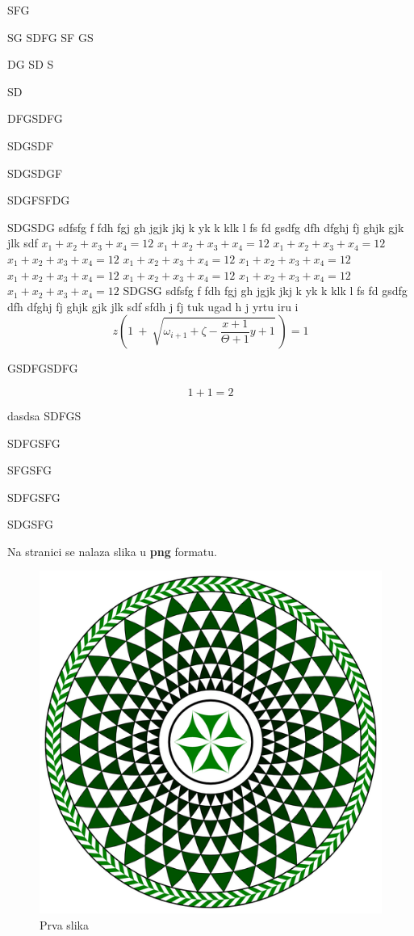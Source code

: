 \documentclass[a4paper,twoside,12pt]{memoir} %
\begin{document}
SFG

SG
SDFG
SF
GS

DG
 SD
S


SD
 

DFGSDFG


SDGSDF


SDGSDGF


SDGFSFDG


SDGSDG  sdfsfg f fdh fgj gh jgjk jkj k yk k klk l fs fd gsdfg dfh dfghj fj ghjk gjk jlk sdf 
$x_1+x_2+x_3+x_4=12$ $x_1+x_2+x_3+x_4=12$
 $x_1+x_2+x_3+x_4=12$ $x_1+x_2+x_3+x_4=12$ $x_1+x_2+x_3+x_4=12$ $x_1+x_2+x_3+x_4=12$
 $x_1+x_2+x_3+x_4=12$ $x_1+x_2+x_3+x_4=12$ $x_1+x_2+x_3+x_4=12$
$x_1+x_2+x_3+x_4=12$ 
SDGSG sdfsfg f fdh fgj gh jgjk jkj k yk k klk l fs fd gsdfg dfh dfghj fj ghjk gjk jlk sdf sfdh j fj tuk ugad h j yrtu iru i
\[ z \left( 1 \ +\ \sqrt{\omega_{i+1} + \zeta -\frac{x+1}{\Theta +1} y + 1}
\ \right) =  1 \]

GSDFGSDFG



\begin{equation}
\label{eq:jed1}
	1+1=2
\end{equation}

dasdsa
SDFGS

SDFGSFG


SFGSFG


SDFGSFG


SDGSFG

\label{stranica}
Na stranici \pageref{stranica} se nalaza slika u \textbf{png} formatu.
\begin{figure}[h!t]
\begin{center}
\includegraphics[scale=0.5]{mosaic-from-pompeii.png}
\caption{Prva slika}
\end{center}
\end{figure}
\end{document}
